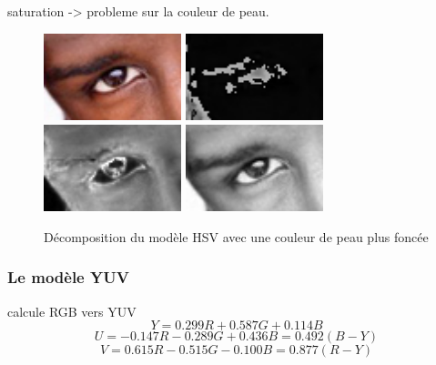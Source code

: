 saturation -> probleme sur la couleur de peau.

\begin{figure}[H]
 \center
 \includegraphics[width=4cm]{image/original_black.png}
 \includegraphics[width=4cm]{image/hue_black.png}
 \includegraphics[width=4cm]{image/saturation_black.png}
 \includegraphics[width=4cm]{image/value_black.png}
 \caption{Décomposition du modèle HSV avec une couleur de peau plus foncée}
\end{figure}

\subsubsection{Le modèle YUV}

calcule RGB vers YUV
$$Y = 0.299R + 0.587 G + 0.114 B$$
$$U = -0.147R - 0.289 G + 0.436B = 0.492(B - Y)$$
$$V = 0.615R -0.515G -0.100B = 0.877(R-Y)$$

